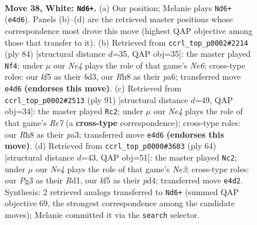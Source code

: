 \documentclass[11pt]{article}
\begin{document}
\clearpage

\begin{figure}[p]\centering
\begin{subfigure}{0.46\textwidth}\centering
\resizebox{\linewidth}{!}{%
\newchessgame
\chessboard[
  setfen={7R/5pp1/4p3/1p3k1p/1r1PNP1P/4P1P1/8/6K1 w - - 1 38},
  showmover=false,
  pgfstyle=straightmove, color=movearrow, markmove={e4-d6}
]}
\caption{}
\end{subfigure}\hfill
\begin{subfigure}{0.46\textwidth}\centering
\resizebox{\linewidth}{!}{%
\newchessgame
\chessboard[
  setfen={7R/1p2k3/p2pN3/3P3p/2P5/1P1bp1r1/P5P1/6K1 w - - 0 43},
  showmover=false,
  pgfstyle=straightmove, color=movearrow, markmove={e6-f4}
]}
\caption{}
\end{subfigure}
\\[4pt]
\begin{subfigure}{0.46\textwidth}\centering
\resizebox{\linewidth}{!}{%
\newchessgame
\chessboard[
  setfen={8/2R2pk1/2p5/1p5p/1P3p1P/P4K2/4rPP1/8 b - - 3 46},
  showmover=false,
  pgfstyle=straightmove, color=movearrow, markmove={e2-c2}
]}
\caption{}
\end{subfigure}\hfill
\begin{subfigure}{0.46\textwidth}\centering
\resizebox{\linewidth}{!}{%
\newchessgame
\chessboard[
  setfen={8/p6r/4np2/8/Pp1pk2P/4N1P1/1P3P1K/3R4 w - - 5 33},
  showmover=false,
  pgfstyle=straightmove, color=movearrow, markmove={e3-c2}
]}
\caption{}
\end{subfigure}
\caption{\textbf{Move 38, White: \texttt{Nd6+}.} (a) Our position; Melanie plays \texttt{Nd6+} (\texttt{e4d6}). Panels (b)--(d) are the retrieved master positions whose correspondence most drove this move (highest QAP objective among those that transfer to it). (b) Retrieved from \texttt{ccrl\_top\_p0002\#2214} (ply 84) [structural distance $d$=35, QAP obj=35]: the master played \texttt{Nf4}; under $\mu$ our \emph{Ne4} plays the role of that game's \emph{Ne6}; cross-type roles: our \emph{k}f5 as their \emph{b}d3, our \emph{R}h8 as their \emph{p}a6; transferred move \texttt{e4d6} \textbf{(endorses this move)}. (c) Retrieved from \texttt{ccrl\_top\_p0002\#2513} (ply 91) [structural distance $d$=49, QAP obj=34]: the master played \texttt{Rc2}; under $\mu$ our \emph{Ne4} plays the role of that game's \emph{Re7} (a \textbf{cross-type} correspondence); cross-type roles: our \emph{R}h8 as their \emph{p}a3; transferred move \texttt{e4d6} \textbf{(endorses this move)}. (d) Retrieved from \texttt{ccrl\_top\_p0000\#3603} (ply 64) [structural distance $d$=43, QAP obj=51]: the master played \texttt{Nc2}; under $\mu$ our \emph{Ne4} plays the role of that game's \emph{Ne3}; cross-type roles: our \emph{P}g3 as their \emph{R}d1, our \emph{k}f5 as their \emph{p}d4; transferred move \texttt{e4d2}. Synthesis: 2 retrieved analogs transferred to \texttt{Nd6+} (summed QAP objective 69, the strongest correspondence among the candidate moves); Melanie committed it via the \texttt{search} selector.}
\label{fig:thought-m74}
\end{figure}
\end{document}
